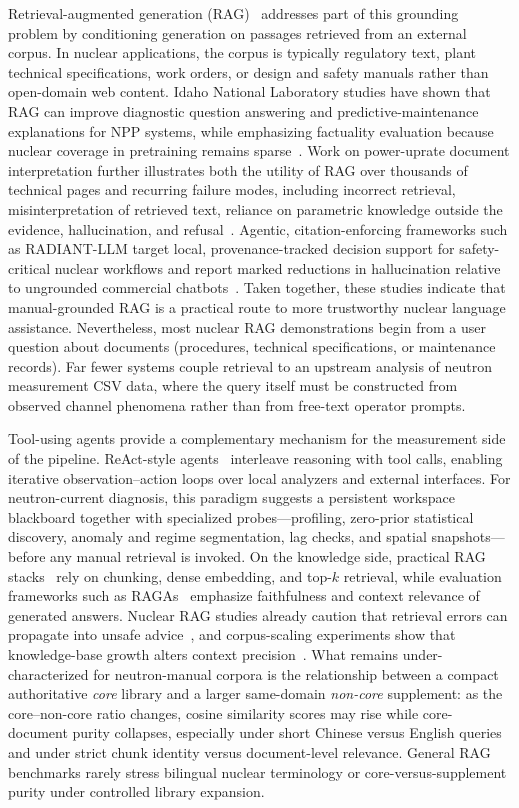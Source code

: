 Retrieval-augmented generation (RAG)~\citep{lewis2020rag} addresses part of this grounding problem by
conditioning generation on passages retrieved from an external corpus.
In nuclear applications, the corpus is typically regulatory text, plant technical specifications, work
orders, or design and safety manuals rather than open-domain web content.
Idaho National Laboratory studies have shown that RAG can improve diagnostic question answering and
predictive-maintenance explanations for NPP systems, while emphasizing factuality evaluation because
nuclear coverage in pretraining remains sparse~\citep{reeves2024reliability,lin2025cws}.
Work on power-uprate document interpretation further illustrates both the utility of RAG over
thousands of technical pages and recurring failure modes, including incorrect retrieval,
misinterpretation of retrieved text, reliance on parametric knowledge outside the evidence,
hallucination, and refusal~\citep{mapes2025uprate}.
Agentic, citation-enforcing frameworks such as RADIANT-LLM target local, provenance-tracked decision
support for safety-critical nuclear workflows and report marked reductions in hallucination relative
to ungrounded commercial chatbots~\citep{ndum2026radiant}.
Taken together, these studies indicate that manual-grounded RAG is a practical route to more
trustworthy nuclear language assistance.
Nevertheless, most nuclear RAG demonstrations begin from a user question about documents
(procedures, technical specifications, or maintenance records).
Far fewer systems couple retrieval to an upstream analysis of neutron measurement CSV data, where the
query itself must be constructed from observed channel phenomena rather than from free-text operator
prompts.

Tool-using agents provide a complementary mechanism for the measurement side of the pipeline.
ReAct-style agents~\citep{yao2023react} interleave reasoning with tool calls, enabling iterative
observation--action loops over local analyzers and external interfaces.
For neutron-current diagnosis, this paradigm suggests a persistent workspace blackboard together with
specialized probes---profiling, zero-prior statistical discovery, anomaly and regime segmentation, lag
checks, and spatial snapshots---before any manual retrieval is invoked.
On the knowledge side, practical RAG stacks~\citep{liu2023llamaindex} rely on chunking, dense
embedding, and top-$k$ retrieval, while evaluation frameworks such as RAGAs~\citep{es2024ragas}
emphasize faithfulness and context relevance of generated answers.
Nuclear RAG studies already caution that retrieval errors can propagate into unsafe
advice~\citep{mapes2025uprate}, and corpus-scaling experiments show that knowledge-base growth alters
context precision~\citep{ndum2026radiant}.
What remains under-characterized for neutron-manual corpora is the relationship between a compact
authoritative \emph{core} library and a larger same-domain \emph{non-core} supplement: as the
core--non-core ratio changes, cosine similarity scores may rise while core-document purity collapses,
especially under short Chinese versus English queries and under strict chunk identity versus
document-level relevance.
General RAG benchmarks rarely stress bilingual nuclear terminology or core-versus-supplement purity
under controlled library expansion.

